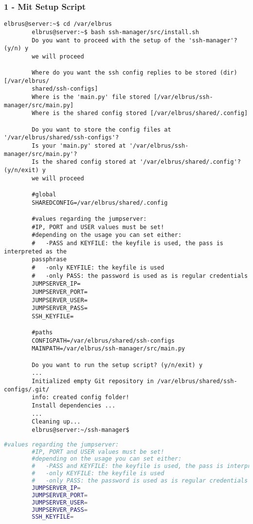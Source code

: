 \documentclass{article}
\begin{document}
	\subsubsection{1 - Mit Setup Script}
	\lstset{style=commands}
	\begin{lstlisting}[caption={Ausführen des 'install.sh' Scripts.}]
		elbrus@server:~$ cd /var/elbrus
		elbrus@server:~$ bash ssh-manager/src/install.sh
		Do you want to proceed with the setup of the 'ssh-manager'? (y/n) y
		we will proceed
		
		Where do you want the ssh config replies to be stored (dir) [/var/elbrus/
		shared/ssh-configs]
		Where is the 'main.py' file stored [/var/elbrus/ssh-manager/src/main.py]
		Where is the shared config stored [/var/elbrus/shared/.config]
		
		Do you want to store the config files at '/var/elbrus/shared/ssh-configs'?
		Is your 'main.py' stored at '/var/elbrus/ssh-manager/src/main.py'?
		Is the shared config stored at '/var/elbrus/shared/.config'? (y/n/exit) y
		we will proceed
		
		#global
		SHAREDCONFIG=/var/elbrus/shared/.config
		
		#values regarding the jumpserver:
		#IP, PORT and USER values must be set!
		#depending on the usage you can set either:
		#   -PASS and KEYFILE: the keyfile is used, the pass is interpreted as the
		passphrase
		#   -only KEYFILE: the keyfile is used
		#   -only PASS: the password is used as is regular credentials
		JUMPSERVER_IP=
		JUMPSERVER_PORT=
		JUMPSERVER_USER=
		JUMPSERVER_PASS=
		SSH_KEYFILE=
		
		#paths
		CONFIGPATH=/var/elbrus/shared/ssh-configs
		MAINPATH=/var/elbrus/ssh-manager/src/main.py
		
		Do you want to run the setup script? (y/n/exit) y
		...
		Initialized empty Git repository in /var/elbrus/shared/ssh-configs/.git/
		info: created config folder!
		Install dependencies ...
		...
		Cleaning up...
		elbrus@server:~/ssh-manager$
	\end{lstlisting}

	\newpage
	\lstset{style=files}
	\begin{lstlisting}[caption={Ergänzen der fehlenden Werten in '.env'.}, language=bash]
		#values regarding the jumpserver:
		#IP, PORT and USER values must be set!
		#depending on the usage you can set either:
		#   -PASS and KEYFILE: the keyfile is used, the pass is interpreted as the passphrase
		#   -only KEYFILE: the keyfile is used
		#   -only PASS: the password is used as is regular credentials
		JUMPSERVER_IP=
		JUMPSERVER_PORT=
		JUMPSERVER_USER=
		JUMPSERVER_PASS=
		SSH_KEYFILE=
	\end{lstlisting}
	
\end{document}
